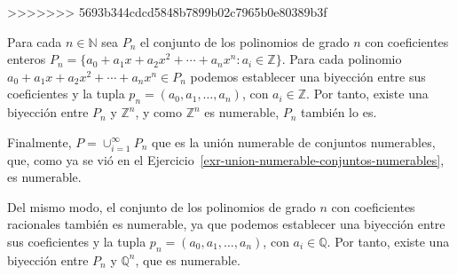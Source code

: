 \documentclass[
  a4paper,
]{scrreport}
\theoremstyle{definition}
\theoremstyle{remark}
\begin{document}
\begin{tcolorbox}
\begin{tcolorbox}
\begin{tcolorbox}
\begin{tcolorbox}
\begin{tcolorbox}
\begin{tcolorbox}
\begin{tcolorbox}
\begin{tcolorbox}
\begin{tcolorbox}
\begin{tcolorbox}
\begin{tcolorbox}
\begin{tcolorbox}
\begin{tcolorbox}
\begin{tcolorbox}
\begin{tcolorbox}
\begin{tcolorbox}
\begin{tcolorbox}
\begin{tcolorbox}
\begin{tcolorbox}
\begin{tcolorbox}
\begin{tcolorbox}
\begin{tcolorbox}
\begin{tcolorbox}
\begin{tcolorbox}
\begin{tcolorbox}
\begin{tcolorbox}
\begin{tcolorbox}
\begin{tcolorbox}
\begin{tcolorbox}
\begin{tcolorbox}
\begin{tcolorbox}
\begin{tcolorbox}
\begin{tcolorbox}
\begin{tcolorbox}
\begin{tcolorbox}
\begin{tcolorbox}
\begin{tcolorbox}
\begin{tcolorbox}
\begin{tcolorbox}
\begin{tcolorbox}
\begin{tcolorbox}
\begin{tcolorbox}
\begin{tcolorbox}
\begin{tcolorbox}
\begin{tcolorbox}[enhanced jigsaw, rightrule=.15mm, colbacktitle=quarto-callout-tip-color!10!white, breakable, bottomrule=.15mm, toprule=.15mm, titlerule=0mm, opacitybacktitle=0.6, opacityback=0, colback=white, leftrule=.75mm, bottomtitle=1mm, colframe=quarto-callout-tip-color-frame, toptitle=1mm, title=\textcolor{quarto-callout-tip-color}{\faLightbulb}\hspace{0.5em}{Solución}, arc=.35mm, left=2mm, coltitle=black]
>>>>>>> 5693b344cdcd5848b7899b02c7965b0e80389b3f

Para cada \(n\in\mathbb{N}\) sea \(P_n\) el conjunto de los polinomios
de grado \(n\) con coeficientes enteros
\(P_n=\{a_0+a_1x+a_2x^2+\cdots+a_nx^n: a_i\in \mathbb{Z}\}\). Para cada
polinomio \(a_0+a_1x+a_2x^2+\cdots+a_nx^n\in P_n\) podemos establecer
una biyección entre sus coeficientes y la tupla
\(p_n=(a_0,a_1,\ldots,a_n)\), con \(a_i\in\mathbb{Z}\). Por tanto,
existe una biyección entre \(P_n\) y \(\mathbb{Z}^n\), y como
\(\mathbb{Z}^n\) es numerable, \(P_n\) también lo es.

Finalmente, \(P=\cup_{i=1}^\infty P_n\) que es la unión numerable de
conjuntos numerables, que, como ya se vió en el
Ejercicio~\ref{exr-union-numerable-conjuntos-numerables}, es numerable.

Del mismo modo, el conjunto de los polinomios de grado \(n\) con
coeficientes racionales también es numerable, ya que podemos establecer
una biyección entre sus coeficientes y la tupla
\(p_n=(a_0,a_1,\ldots,a_n)\), con \(a_i\in\mathbb{Q}\). Por tanto,
existe una biyección entre \(P_n\) y \(\mathbb{Q}^n\), que es numerable.

\end{tcolorbox}


\end{tcolorbox}
\end{tcolorbox}
\end{tcolorbox}
\end{tcolorbox}
\end{tcolorbox}
\end{tcolorbox}
\end{tcolorbox}
\end{tcolorbox}
\end{tcolorbox}
\end{tcolorbox}
\end{tcolorbox}
\end{tcolorbox}
\end{tcolorbox}
\end{tcolorbox}
\end{tcolorbox}
\end{tcolorbox}
\end{tcolorbox}
\end{tcolorbox}
\end{tcolorbox}
\end{tcolorbox}
\end{tcolorbox}
\end{tcolorbox}
\end{tcolorbox}
\end{tcolorbox}
\end{tcolorbox}
\end{tcolorbox}
\end{tcolorbox}
\end{tcolorbox}
\end{tcolorbox}
\end{tcolorbox}
\end{tcolorbox}
\end{tcolorbox}
\end{tcolorbox}
\end{tcolorbox}
\end{tcolorbox}
\end{tcolorbox}
\end{tcolorbox}
\end{tcolorbox}
\end{tcolorbox}
\end{tcolorbox}
\end{tcolorbox}
\end{tcolorbox}
\end{tcolorbox}
\end{tcolorbox}
\end{document}

